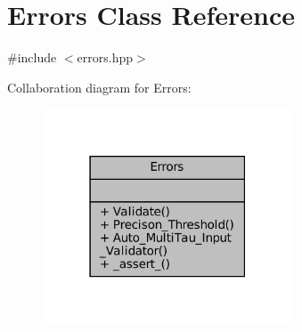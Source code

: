 \hypertarget{classErrors}{}\section{Errors Class Reference}
\label{classErrors}


{\ttfamily \#include $<$errors.\+hpp$>$}



Collaboration diagram for Errors\+:
\nopagebreak
\begin{figure}[H]
\begin{center}
\leavevmode
\includegraphics[width=210pt]{dc/dc7/classErrors__coll__graph}
\end{center}
\end{figure}

